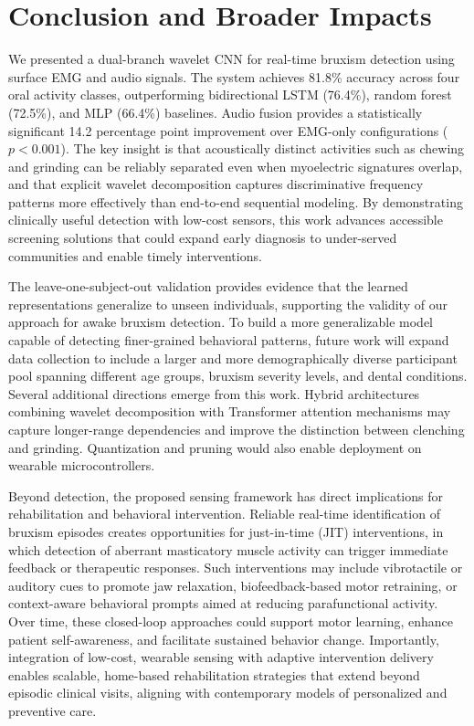 \documentclass[pdflatex,sn-vancouver-num, iicol]{sn-jnl}
\begin{document}
\section{Conclusion and Broader Impacts}


We presented a dual-branch wavelet CNN for real-time bruxism detection using surface EMG and audio signals. The system achieves 81.8\% accuracy across four oral activity classes, outperforming bidirectional LSTM (76.4\%), random forest (72.5\%), and MLP (66.4\%) baselines. Audio fusion provides a statistically significant 14.2 percentage point improvement over EMG-only configurations ($p < 0.001$). The key insight is that acoustically distinct activities such as chewing and grinding can be reliably separated even when myoelectric signatures overlap, and that explicit wavelet decomposition captures discriminative frequency patterns more effectively than end-to-end sequential modeling. By demonstrating clinically useful detection with low-cost sensors, this work advances accessible screening solutions that could expand early diagnosis to under-served communities and enable timely interventions.


The leave-one-subject-out validation provides evidence that the learned representations generalize to unseen individuals, supporting the validity of our approach for awake bruxism detection. To build a more generalizable model capable of detecting finer-grained behavioral patterns, future work will expand data collection to include a larger and more demographically diverse participant pool spanning different age groups, bruxism severity levels, and dental conditions. Several additional directions emerge from this work. Hybrid architectures combining wavelet decomposition with Transformer attention mechanisms may capture longer-range dependencies and improve the distinction between clenching and grinding. Quantization and pruning would also enable deployment on wearable microcontrollers.

Beyond detection, the proposed sensing framework has direct implications for rehabilitation and behavioral intervention. Reliable real-time identification of bruxism episodes creates opportunities for just-in-time (JIT) interventions, in which detection of aberrant masticatory muscle activity can trigger immediate feedback or therapeutic responses. Such interventions may include vibrotactile or auditory cues to promote jaw relaxation, biofeedback-based motor retraining, or context-aware behavioral prompts aimed at reducing parafunctional activity. Over time, these closed-loop approaches could support motor learning, enhance patient self-awareness, and facilitate sustained behavior change. Importantly, integration of low-cost, wearable sensing with adaptive intervention delivery enables scalable, home-based rehabilitation strategies that extend beyond episodic clinical visits, aligning with contemporary models of personalized and preventive care.
\end{document}
